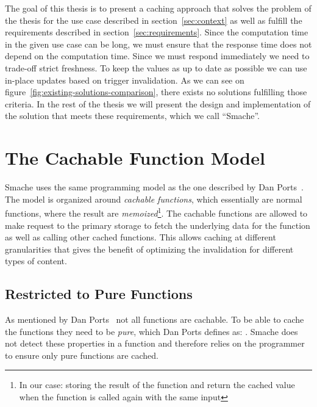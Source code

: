 The goal of this thesis is to present a caching approach that solves the problem of the thesis for the use case described in section~\ref{sec:context} as well as fulfill the requirements described in section~\ref{sec:requirements}. Since the computation time in the given use case can be long, we must ensure that the response time does not depend on the computation time. Since we must respond immediately we need to trade-off strict freshness. To keep the values as up to date as possible we can use in-place updates based on trigger invalidation. As we can see on figure~\ref{fig:existing-solutions-comparison}, there exists no solutions fulfilling those criteria. In the rest of the thesis we will present the design and implementation of the solution that meets these requirements, which we call ``Smache''.


\section{The Cachable Function Model}
\label{sec:the_cachable_function_model}

Smache uses the same programming model as the one described by Dan Ports~\cite{paper:liskov}. The model is organized around \emph{cachable functions}, which essentially are normal functions, where the result are \emph{memoized}\footnote{In our case: storing the result of the function and return the cached value when the function is called again with the same input}. The cachable functions are allowed to make request to the primary storage to fetch the underlying data for the function as well as calling other cached functions. This allows caching at different granularities that gives the benefit of optimizing the invalidation for different types of content.


\subsection{Restricted to Pure Functions}
\label{subsec:restricted_to_pure_functions}

As mentioned by Dan Ports~\cite{paper:liskov} not all functions are cachable. To be able to cache the functions they need to be \emph{pure}, which Dan Ports defines as: . Smache does not detect these properties in a function and therefore relies on the programmer to ensure only pure functions are cached.

